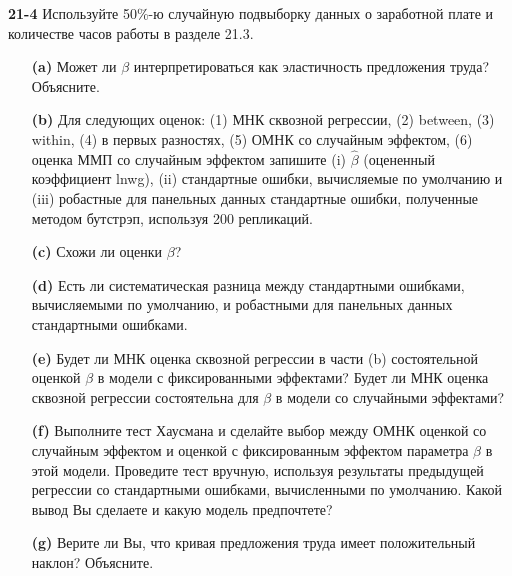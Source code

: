 \textbf{21-4} Используйте 50\%-ю случайную подвыборку данных о заработной плате и количестве часов работы в разделе 21.3.
\begin{itemize}
\item[{\bf (a)}] Может ли $\beta$ интерпретироваться как эластичность предложения труда? Объясните.

\item[{\bf (b)}] Для следующих оценок: (1) МНК сквозной регрессии, (2)  between, (3) within, (4)  в первых разностях, (5) ОМНК со случайным эффектом, (6) оценка ММП со случайным эффектом запишите (i) $\hat{\beta}$ (оцененный коэффициент lnwg), (ii) стандартные ошибки, вычисляемые по умолчанию и (iii) робастные для панельных данных стандартные ошибки, полученные методом бутстрэп, используя 200 репликаций.

\item[{\bf (c)}] Схожи ли оценки $\beta$?

\item[{\bf (d)}] Есть ли систематическая разница между стандартными ошибками, вычисляемыми по умолчанию, и робастными для панельных данных стандартными ошибками.

\item[{\bf (e)}] Будет ли МНК оценка сквозной регрессии в части (b)  состоятельной оценкой $\beta$ в модели с фиксированными эффектами? Будет ли МНК оценка сквозной регрессии состоятельна для $\beta$ в модели со случайными эффектами?

\item[{\bf (f)}] Выполните тест Хаусмана и сделайте выбор между ОМНК оценкой со случайным эффектом и оценкой с фиксированным эффектом параметра $\beta$ в этой модели. Проведите тест вручную, используя результаты предыдущей регрессии со стандартными ошибками, вычисленными по умолчанию. Какой вывод Вы сделаете и какую модель предпочтете?

\item[{\bf (g)}] Верите ли Вы, что кривая предложения труда имеет положительный наклон? Объясните.

\end{itemize}
